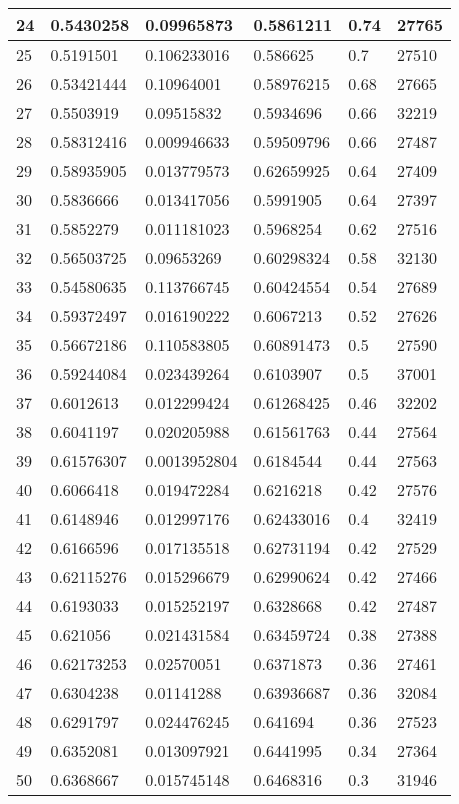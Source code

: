 \begin{longtable}{|l|l|l|l|l|l|}
24 & 0.5430258 & 0.09965873 & 0.5861211 & 0.74 & 27765 \\ \hline 
25 & 0.5191501 & 0.106233016 & 0.586625 & 0.7 & 27510 \\ \hline 
26 & 0.53421444 & 0.10964001 & 0.58976215 & 0.68 & 27665 \\ \hline 
27 & 0.5503919 & 0.09515832 & 0.5934696 & 0.66 & 32219 \\ \hline 
28 & 0.58312416 & 0.009946633 & 0.59509796 & 0.66 & 27487 \\ \hline 
29 & 0.58935905 & 0.013779573 & 0.62659925 & 0.64 & 27409 \\ \hline 
30 & 0.5836666 & 0.013417056 & 0.5991905 & 0.64 & 27397 \\ \hline 
31 & 0.5852279 & 0.011181023 & 0.5968254 & 0.62 & 27516 \\ \hline 
32 & 0.56503725 & 0.09653269 & 0.60298324 & 0.58 & 32130 \\ \hline 
33 & 0.54580635 & 0.113766745 & 0.60424554 & 0.54 & 27689 \\ \hline 
34 & 0.59372497 & 0.016190222 & 0.6067213 & 0.52 & 27626 \\ \hline 
35 & 0.56672186 & 0.110583805 & 0.60891473 & 0.5 & 27590 \\ \hline 
36 & 0.59244084 & 0.023439264 & 0.6103907 & 0.5 & 37001 \\ \hline 
37 & 0.6012613 & 0.012299424 & 0.61268425 & 0.46 & 32202 \\ \hline 
38 & 0.6041197 & 0.020205988 & 0.61561763 & 0.44 & 27564 \\ \hline 
39 & 0.61576307 & 0.0013952804 & 0.6184544 & 0.44 & 27563 \\ \hline 
40 & 0.6066418 & 0.019472284 & 0.6216218 & 0.42 & 27576 \\ \hline 
41 & 0.6148946 & 0.012997176 & 0.62433016 & 0.4 & 32419 \\ \hline 
42 & 0.6166596 & 0.017135518 & 0.62731194 & 0.42 & 27529 \\ \hline 
43 & 0.62115276 & 0.015296679 & 0.62990624 & 0.42 & 27466 \\ \hline 
44 & 0.6193033 & 0.015252197 & 0.6328668 & 0.42 & 27487 \\ \hline 
45 & 0.621056 & 0.021431584 & 0.63459724 & 0.38 & 27388 \\ \hline 
46 & 0.62173253 & 0.02570051 & 0.6371873 & 0.36 & 27461 \\ \hline 
47 & 0.6304238 & 0.01141288 & 0.63936687 & 0.36 & 32084 \\ \hline 
48 & 0.6291797 & 0.024476245 & 0.641694 & 0.36 & 27523 \\ \hline 
49 & 0.6352081 & 0.013097921 & 0.6441995 & 0.34 & 27364 \\ \hline 
50 & 0.6368667 & 0.015745148 & 0.6468316 & 0.3 & 31946 \\ \hline 
\end{longtable}